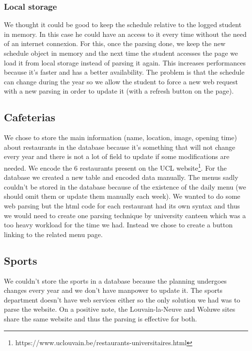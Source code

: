 \documentclass{eplmastersthesis}
\begin{document}
\subsubsection{Local storage}
We thought it could be good to keep the schedule relative to the logged student in memory. In this case he could have an access to it every time without the need of an internet connexion. For this, once the parsing done, we keep the new schedule object in memory and the next time the student accesses the page we load it from local storage instead of parsing it again. This increases performances because it's faster and has a better availability. The problem is that the schedule can change during the year so we allow the student to force a new web request with a new parsing in order to update it (with a refresh button on the page).

\subsection{Cafeterias}
We chose to store the main information (name, location, image, opening time) about restaurants in the database because it's  something that will not change every year and there is not a lot of field to update if some modifications are needed. We encode the 6 restaurants present on the UCL website\footnote{https://www.uclouvain.be/restaurants-universitaires.html}. For the database we created a new table and encoded data manually. The menus sadly couldn't be stored in the database because of the existence of the daily menu (we should omit them or update them manually each week). We wanted to do some web parsing but the html code for each restaurant had its own syntax and thus we would need to create one parsing technique by university canteen which was a too heavy workload for the time we had. Instead we chose to create a button linking to the related menu page.
\subsection{Sports}
We couldn't store the sports in a database because the planning undergoes changes every year and we don't have manpower to update it. The sports department doesn't have web services either so the only solution we had was to parse the website. On a positive note, the Louvain-la-Neuve and Woluwe sites share the same website and thus the parsing is effective for both. 
\end{document}
